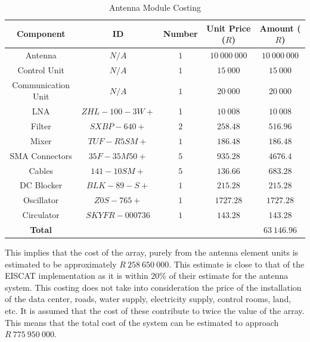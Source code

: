 \documentclass[11pt]{witseiepaper}
\begin{document}
\begin{table}[htb]
    \caption{Antenna Module Costing}
    \label{tab:CostingUnit}
    \begin{center}
        \begin{tabular}{c c c c c}
            \hline 
            Component & ID & Number & Unit Price ($R$) & Amount ($R$) \\
            \hline
            Antenna & $N/A$ & $1$ & $10~000~000$ & $10~000~000$ \\
            Control Unit & $N/A$ & $1$ & $15~000$ & $15~000$ \\
            Communication Unit & $N/A$ & $1$ & $20~000$ & $20~000$ \\

            LNA & $ZHL-100-3W+$ \cite{LNA} & 1 & $10~008$ & $10~008$ \\
            Filter & $SXBP-640+$ \cite{Filter} & $2$ & $258.48$ & $516.96$ \\
            Mixer & $TUF-R5SM+$ \cite{Mixer} & $1$ & $186.48$ & $186.48$ \\
            SMA Connectors & $35F-35M50+$ \cite{SMA} & $5$ & $935.28$ & $4676.4$ \\
            Cables & $141-10SM+$ \cite{Cables} & $5$ & $136.66$ & $683.28$ \\
            DC Blocker & $BLK-89-S+$ \cite{DCBlocker} & $1$ & $215.28$ & $215.28$ \\
            Oscillator & $Z0S-765+$ \cite{Oscillator} & $1$ & $1727.28$ & $1727.28$ \\
            Circulator & $SKYFR-000736$ \cite{Circulator} & $1$ & $143.28$ & $143.28$ \\  
            \hline
            \textbf{Total} & & & & \textbf{$63~146.96$} \\ 
            \hline
        \end{tabular}
    \end{center}
\end{table}
This implies that the cost of the array, purely from the antenna element units is estimated to be approximately $R~258~650~000$. This estimate is close to that of the EISCAT implementation as it is within $20\%$ of their estimate for the antenna system.
This costing does not take into consideration the price of the installation of the data center, roads, water supply, electricity supply, control rooms, land, etc. It is assumed that the cost of these contribute to twice the value of the array.
This means that the total cost of the system can be estimated to approach $R~775~950~000$.
\end{document}
